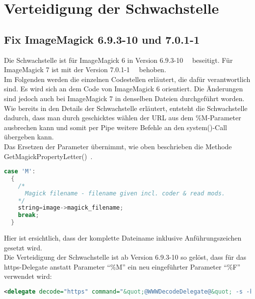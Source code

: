 \newpage
\section{Verteidigung der Schwachstelle}\label{sec:verteidigung-der-schwachstelle}
\subsection{Fix ImageMagick 6.9.3-10 und 7.0.1-1}\label{subsec:fix-imagemagick-6.9.3-10}

Die Schwachstelle ist für ImageMagick 6 in Version 6.9.3-10~\cite{Fix6A}~\cite{Fix6B} beseitigt.
Für ImageMagick 7 ist mit der Version 7.0.1-1~\cite{Fix7A}~\cite{Fix7B} behoben.\\
Im Folgenden werden die einzelnen Codestellen erläutert, die dafür verantwortlich sind.
Es wird sich an dem Code von ImageMagick 6 orientiert.
Die Änderungen sind jedoch auch bei ImageMagick 7 in denselben Dateien durchgeführt worden.\\

Wie bereits in den Details der Schwachstelle erläutert,
entsteht die Schwachstelle dadurch,
dass man durch geschicktes wählen der URL aus dem \%M-Parameter ausbrechen kann und
somit per Pipe weitere Befehle an den system()-Call übergeben kann.\\

Das Ersetzen der Parameter übernimmt, wie oben beschrieben die Methode\\ GetMagickPropertyLetter()~\cite{DeklarationGetMgickPropertyLetter}.

\begin{lstlisting}[firstnumber=2627, language=C, caption=magick/property.c Ungefilterte Weitergabe M-Parameter,label={lst:lstlisting}]
  case 'M':
  {
    /*
      Magick filename - filename given incl. coder & read mods.
    */
    string=image->magick_filename;
    break;
  }
\end{lstlisting}
\vspace{5mm}

Hier ist ersichtlich, dass der komplette Dateiname inklusive Anführungszeichen gesetzt wird.\\

Die Verteidigung der Schwachstelle ist ab Version 6.9.3-10 so gelöst, dass für das https-Delegate anstatt Parameter "`\%M"' ein neu eingeführter Parameter "`\%F"'~\cite{CompareDelegatexXML} verwendet wird:

\begin{lstlisting}[firstnumber=91, language=XML, caption=config/delegates.xml.in https-Delegate 6.9.3-10,label={lst:lstlisting}]
  <delegate decode="https" command="&quot;@WWWDecodeDelegate@&quot; -s -k -L -o &quot;%o&quot; &quot;https:%F&quot;"/>
\end{lstlisting}
\vspace{5mm}

